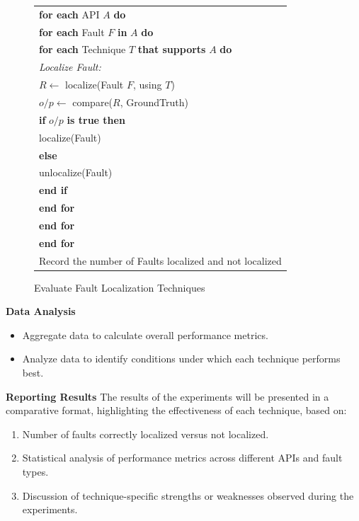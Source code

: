 \documentclass[conference]{IEEEtran}
\begin{document}
\begin{figure}[!h]
    \centering
    \caption{Evaluate Fault Localization Techniques}
    \begin{tabularx}{\columnwidth}{X}
    \textbf{for each} API \( A \) \textbf{do} \\
    \quad \textbf{for each} Fault \( F \) \textbf{in} \( A \) \textbf{do} \\
    \quad\quad \textbf{for each} Technique \( T \) \textbf{that supports} \( A \) \textbf{do} \\
    \quad\quad\quad \textit{Localize Fault:} \\
    \quad\quad\quad \( R \leftarrow \) localize(Fault \( F \), using \( T \)) \\
    \quad\quad\quad \( o/p \leftarrow \) compare(\( R \), GroundTruth) \\
    \quad\quad\quad \textbf{if} \( o/p \) \textbf{is true then} \\
    \quad\quad\quad\quad localize(Fault) \\
    \quad\quad\quad \textbf{else} \\
    \quad\quad\quad\quad unlocalize(Fault) \\
    \quad\quad\quad \textbf{end if} \\
    \quad\quad \textbf{end for} \\
    \quad \textbf{end for} \\
    \textbf{end for} \\

    Record the number of Faults localized and not localized
    \end{tabularx}
    \end{figure}
    
\textbf{Data Analysis}
    \begin{itemize}
        \item Aggregate data to calculate overall performance metrics.
        \item Analyze data to identify conditions under which each technique performs best.
    \end{itemize}
    


\textbf{Reporting Results}
The results of the experiments will be presented in a comparative format, highlighting the effectiveness of each technique, based on:
\begin{enumerate}
    \item Number of faults correctly localized versus not localized.
    \item Statistical analysis of performance metrics across different APIs and fault types.
    \item Discussion of technique-specific strengths or weaknesses observed during the experiments.
\end{enumerate}
\end{document}
